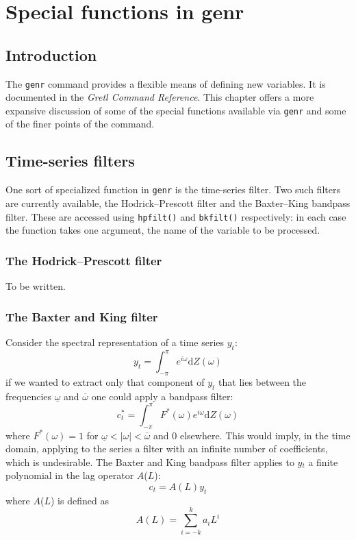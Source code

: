 \chapter{Special functions in genr}
\label{chap-genr}



\section{Introduction}
\label{genr-intro}

The \verb+genr+ command provides a flexible means of defining new
variables.  It is documented in the \emph{Gretl Command Reference}.
This chapter offers a more expansive discussion of some of the special
functions available via \verb+genr+ and some of the finer points of
the command.
    

\section{Time-series filters}
\label{genr-filter}

One sort of specialized function in \verb+genr+ is the time-series
filter.  Two such filters are currently available, the
Hodrick--Prescott filter and the Baxter--King bandpass filter. These
are accessed using \verb+hpfilt()+ and \verb+bkfilt()+ respectively:
in each case the function takes one argument, the name of the variable
to be processed.
    

\subsection{The Hodrick--Prescott filter}
\label{hodrick-prescott}

To be written.

\subsection{The Baxter and King filter}
\label{baxter-king}

Consider the spectral representation of a time series $y_t$:
%	
\[ y_t = \int_{-\pi}^{\pi} e^{i\omega} \mathrm{d} Z(\omega) \]
%
if we wanted to extract only that component of $y_t$ that lies between
the frequencies $\underline{\omega}$ and $\overline{\omega}$ one could
apply a bandpass filter:
%	
\[ c^*_t = \int_{-\pi}^{\pi} F^*(\omega) e^{i\omega} \mathrm{d}
Z(\omega) \]
%
where $F^*(\omega) = 1$ for $\underline{\omega} < |\omega| <
\overline{\omega}$ and 0 elsewhere. This would imply, in the time
domain, applying to the series a filter with an infinite number of
coefficients, which is undesirable. The Baxter and King bandpass
filter applies to $y\ensuremath{_{t}}$ a finite polynomial in the lag
operator $A$($L$):
%	
\[ c_t = A(L) y_t \]
%
where $A$($L$) is defined as
%	
\[ A(L) = \sum_{i=-k}^{k} a_i L^i \]

